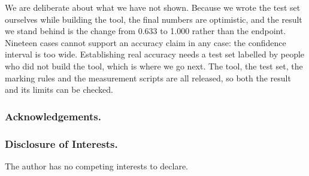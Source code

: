 \documentclass[runningheads]{llncs}
\begin{document}
We are deliberate about what we have not shown. Because we wrote the test set
ourselves while building the tool, the final numbers are optimistic, and the
result we stand behind is the change from 0.633 to 1.000 rather than the
endpoint. Nineteen cases cannot support an accuracy claim in any case: the
confidence interval is too wide. Establishing real accuracy needs a test set
labelled by people who did not build the tool, which is where we go next. The
tool, the test set, the marking rules and the measurement scripts are all
released, so both the result and its limits can be checked.

\subsubsection*{Acknowledgements.}

\subsubsection*{Disclosure of Interests.}
The author has no competing interests to declare.
\end{document}
